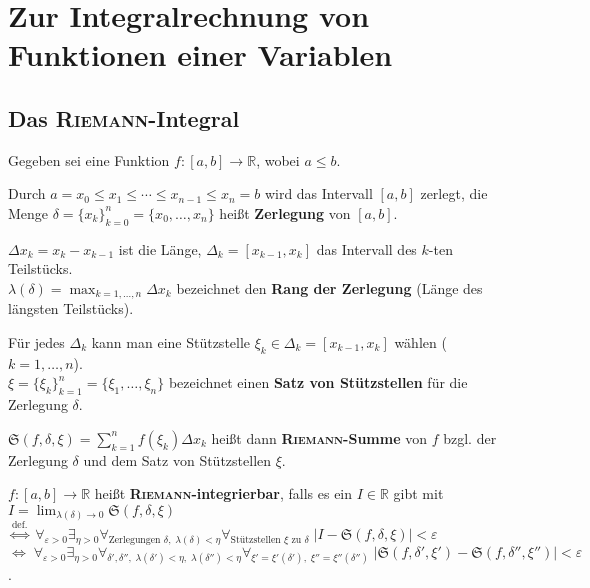 \chapter{%
    Zur Integralrechnung von Funktionen einer Variablen%
}

\section{%
    Das \textsc{Riemann}-Integral%
}

Gegeben sei eine Funktion $f: [a,b] \rightarrow \mathbb{R}$, wobei $a \le b$.

Durch $a = x_0 \le x_1 \le \cdots \le x_{n-1} \le x_n = b$ wird das Intervall
$[a,b]$ zerlegt, die Menge $\delta = \{x_k\}_{k=0}^n = \{x_0, \ldots, x_n\}$
heißt \textbf{Zerlegung} von $[a,b]$.

$\Delta x_k = x_k - x_{k-1}$ ist die Länge, $\Delta_k = [x_{k-1}, x_k]$ das
Intervall des $k$-ten Teilstücks.\\
$\lambda(\delta) = \max_{k=1,\ldots,n} \Delta x_k$ bezeichnet den
\textbf{Rang der Zerlegung} (Länge des längsten Teilstücks).

Für jedes $\Delta_k$ kann man eine Stützstelle
$\xi_k \in \Delta_k = [x_{k-1}, x_k]$ wählen ($k = 1, \ldots, n$). \\
$\xi = \{\xi_k\}_{k=1}^n = \{\xi_1, \ldots, \xi_n\}$ bezeichnet einen
\textbf{Satz von Stützstellen} für die Zerlegung $\delta$.

$\mathfrak{S}(f, \delta, \xi) = \sum_{k=1}^n f(\xi_k) \Delta x_k$ heißt dann
\textbf{\textsc{Riemann}-Summe} von $f$ bzgl. der Zerlegung $\delta$ und dem
Satz von Stützstellen $\xi$.

\linie

$f: [a,b] \rightarrow \mathbb{R}$ heißt \textbf{\textsc{Riemann}-integrierbar},
falls es ein $I \in \mathbb{R}$ gibt mit
$I = \lim_{\lambda(\delta) \to 0} \mathfrak{S}(f, \delta, \xi)$ \\
$\overset{\text{def.}}{\Leftrightarrow}\;
\forall_{\varepsilon > 0}
\exists_{\eta > 0}
\forall_{\text{Zerlegungen } \delta,\; \lambda(\delta) < \eta}
\forall_{\text{Stützstellen } \xi \text{ zu } \delta}\;
|I - \mathfrak{S}(f, \delta, \xi)| < \varepsilon$ \\
$\Leftrightarrow\;
\forall_{\varepsilon > 0}
\exists_{\eta > 0}
\forall_{\delta', \delta'',\; \lambda(\delta') < \eta,\;
\lambda(\delta'') < \eta}
\forall_{\xi' = \xi'(\delta'),\; \xi'' = \xi''(\delta'')}\;
|\mathfrak{S}(f, \delta', \xi') - \mathfrak{S}(f, \delta'', \xi'')|
< \varepsilon$.

